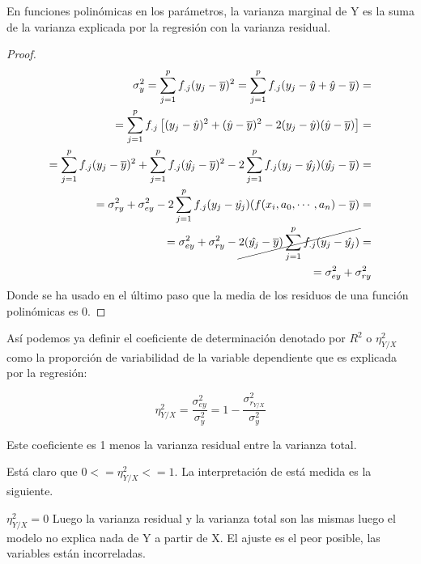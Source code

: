 \documentclass{article}
\theoremstyle{definition}
\begin{document}
	\begin{theorem}
	En funciones polinómicas en los parámetros, la varianza marginal de Y es la suma
	de la varianza explicada por la regresión con la varianza residual.
	\end{theorem}
	\newpage
	\begin{proof}
	\begin{align*}
		\sigma_y^2 = \sum_{j=1}^p f_{.j} (y_j - \overline{y})^2 =
		\sum_{j=1}^p f_{.j} (y_j - \hat{y} + \hat{y} - \overline{y}) = \\
		= \sum_{j=1}^p f_{.j}\left[ (y_j - \hat{y})^2 +
		(\hat{y} - \overline{y})^2 - 2(y_j - \hat{y})(\hat{y}-\overline{y})\right] = \\
		= \sum_{j=1}^p f_{.j} (y_j - \overline{y})^2
		+ \sum_{j=1}^p f_{.j} (\hat{y_j} - \overline{y})^2
		-2 \sum_{j=1}^p f_{.j} (y_j - \hat{y_j})(\hat{y_j} - \overline{y}) = \\
		= \sigma_{ry}^2 + \sigma_{ey}^2
							- 2\sum_{j=1}^p f_{.j}
											(y_j - \hat{y_j})
											(f(x_i, a_ 0, \cdots, a_n) - \overline{y}) = \\
		= \sigma_{ey}^2 + \sigma_{ry}^2
							- \cancel{2(\hat{y_j} - \overline{y})
								\sum_{j=1}^p f_{.j}(y_j - \hat{y_j})} = \\
		= \sigma_{ey}^2 + \sigma_{ry}^2
	\end{align*}
	Donde se ha usado en el último paso que la media de los residuos de una
	función polinómicas es 0.
	\end{proof}


	Así podemos ya definir el coeficiente de determinación denotado por $R^2$ o
	$\eta_{Y/X}^2$ como la proporción de variabilidad de la variable dependiente
	que es explicada por la regresión:

	$$
	\eta_{Y/X}^2 =\frac{\sigma_{ey}^2}{\sigma_y^2}  = 1 -\frac{\sigma_{r_{Y/X}}^2}{\sigma_y^2}
	$$

	Este coeficiente es 1 menos la varianza residual entre la varianza total.

	Está claro que $ 0 <= \eta_{Y/X}^2  <= 1 $. La interpretación de está medida
	es la siguiente.

\vspace{2mm}

	$ \eta_{Y/X}^2 = 0 $ Luego la varianza residual y la varianza total son las
	mismas luego el modelo no explica nada de Y a partir de X. El ajuste es el
	peor posible, las variables están incorreladas.
\end{document}
